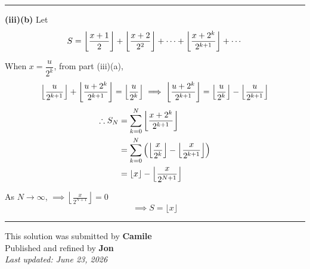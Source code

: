 \documentclass[12pt]{article}
\begin{document}
\bigskip\hrule\bigskip

\textbf{(iii)(b)} Let
$$S=\left\lfloor \frac{x+1}{2}\right\rfloor+\left\lfloor \frac{x+2}{2^2}\right\rfloor+\cdots+\left\lfloor \frac{x+2^k}{2^{k+1}}\right\rfloor+\cdots$$

When $x=\dfrac{u}{2^k}$,  from part (iii)(a),
$$\left\lfloor \frac{u}{2^{k+1}}\right\rfloor+\left\lfloor \frac{u+2^k}{2^{k+1}}\right\rfloor=\left\lfloor \frac{u}{2^k}\right\rfloor \implies \left\lfloor \frac{u+2^k}{2^{k+1}}\right\rfloor=\left\lfloor \frac{u}{2^k}\right\rfloor-\left\lfloor \frac{u}{2^{k+1}}\right\rfloor$$
\begin{align*}
\therefore S_N
&=\sum_{k=0}^{N}\left\lfloor \frac{x+2^k}{2^{k+1}}\right\rfloor\\
&=\sum_{k=0}^{N}\left(\left\lfloor \frac{x}{2^k}\right\rfloor-\left\lfloor \frac{x}{2^{k+1}}\right\rfloor\right)\\
&=\left\lfloor x\right\rfloor-\left\lfloor \frac{x}{2^{N+1}}\right\rfloor
\end{align*}

As $N\to\infty$, $\implies\left\lfloor\frac{x}{2^{N+1}}\right\rfloor=0$
$$\implies\boxed{S=\lfloor x\rfloor}$$

\bigskip
\hrule
\begin{center}
    This solution was submitted by \textbf{Camile}\\[4pt]
    Published and refined by \textbf{Jon}\\[8pt]
    \textit{Last updated: June 23, 2026}
\end{center}
\end{document}
